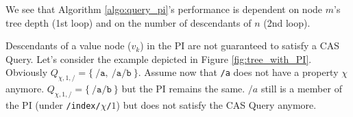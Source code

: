 \documentclass[abstracton,12pt]{scrreprt}
\begin{document}
We see that Algorithm \ref{algo:query_pi}'s performance is dependent on node $m$'s tree depth (1st loop) and on the number of descendants of $n$ (2nd loop). 

Descendants of a value node ($v_k$) in the PI are not guaranteed to satisfy a CAS Query. 
Let's consider the example depicted in Figure \ref{fig:tree_with_PI}.
Obviously $Q_{\chi, 1, \texttt{/}} = \{\ \texttt{/a},\ \texttt{/a/b}\ \}$.
Assume now that \texttt{/a} does not have a property $\chi$ anymore.
$Q_{\chi, 1, \texttt{/}} = \{\ \texttt{/a/b}\ \}$ but the PI remains the same.
$/a$ still is a member of the PI (under \texttt{/index/$\chi$/$1$}) but does not satisfy the CAS Query anymore.






\end{document}
